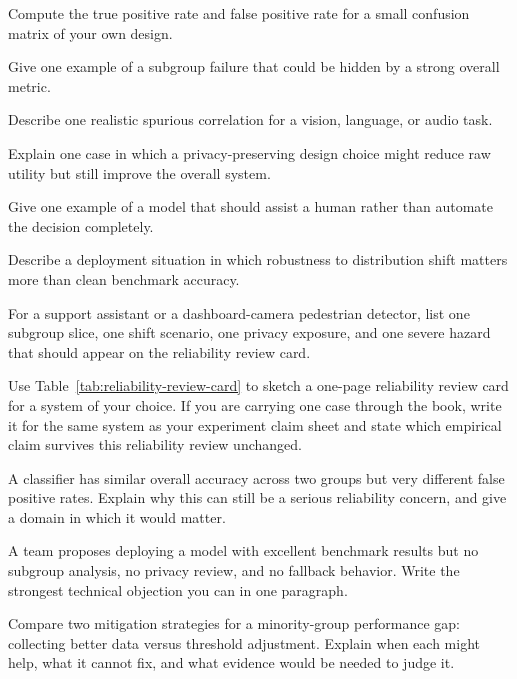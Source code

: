 \begin{exercises}
\item Compute the true positive rate and false positive rate for a small confusion matrix of your own design.
\item Give one example of a subgroup failure that could be hidden by a strong overall metric.
\item Describe one realistic spurious correlation for a vision, language, or audio task.
\item Explain one case in which a privacy-preserving design choice might reduce raw utility but still improve the overall system.
\item Give one example of a model that should assist a human rather than automate the decision completely.
\item Describe a deployment situation in which robustness to distribution shift matters more than clean benchmark accuracy.
\item For a support assistant or a dashboard-camera pedestrian detector, list one subgroup slice, one shift scenario, one privacy exposure, and one severe hazard that should appear on the reliability review card.
\item Use Table~\ref{tab:reliability-review-card} to sketch a one-page reliability review card for a system of your choice. If you are carrying one case through the book, write it for the same system as your experiment claim sheet and state which empirical claim survives this reliability review unchanged.
\end{exercises}

\begin{challengeexercises}
\item A classifier has similar overall accuracy across two groups but very different false positive rates. Explain why this can still be a serious reliability concern, and give a domain in which it would matter.
\item A team proposes deploying a model with excellent benchmark results but no subgroup analysis, no privacy review, and no fallback behavior. Write the strongest technical objection you can in one paragraph.
\item Compare two mitigation strategies for a minority-group performance gap: collecting better data versus threshold adjustment. Explain when each might help, what it cannot fix, and what evidence would be needed to judge it.
\end{challengeexercises}
